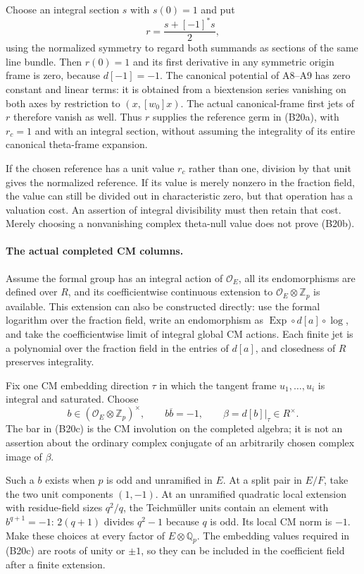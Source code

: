 \documentclass[11pt]{article}
\newcommand{\Q}{\mathbb Q}\newcommand{\C}{\mathbb C}\newcommand{\Z}{\mathbb Z}\newcommand{\R}{\mathbb R}\newcommand{\A}{\mathbb A}\newcommand{\OO}{\mathcal O}
\theoremstyle{definition}\newtheorem{definition}[theorem]{Definition}\newtheorem{remark}[theorem]{Remark}
\begin{document}
Choose an integral section $s$ with $s(0)=1$ and put
\[
                        r=\frac{s+[-1]^*s}{2},
\]
using the normalized symmetry to regard both summands as
sections of the same line bundle.  Then $r(0)=1$ and its
first derivative in any symmetric origin frame is zero,
because $d[-1]=-1$.  The canonical potential of A8--A9 has
zero constant and linear terms: it is obtained from a
biextension series vanishing on both axes by restriction
to $(x,[w_0]x)$.  The actual canonical-frame first jets of
$r$ therefore vanish as well.  Thus $r$ supplies the reference
germ in (B20a), with $r_c=1$ and with an integral section,
without assuming the integrality of its entire canonical
theta-frame expansion.

If the chosen reference has a unit value $r_c$ rather than one,
division by that unit gives the normalized reference.  If its
value is merely nonzero in the fraction field, the value can
still be divided out in characteristic zero, but that operation
has a valuation cost.  An assertion of integral divisibility
must then retain that cost.  Merely choosing a nonvanishing
complex theta-null value does not prove (B20b).

\paragraph{The actual completed CM columns.}
Assume the formal group has an integral action of $\OO_E$,
all its endomorphisms are defined over $R$, and its coefficientwise
continuous extension to $\OO_E\otimes\Z_p$ is available.
This extension can also be constructed directly: use the formal
logarithm over the fraction field, write an endomorphism as
$\operatorname{Exp}\circ d[a]\circ\log$, and take the
coefficientwise limit of integral global CM actions.  Each finite
jet is a polynomial over the fraction field in the entries of
$d[a]$, and closedness of $R$ preserves integrality.

Fix one CM embedding direction $\tau$ in which the tangent
frame $u_1,\ldots,u_i$ is integral and saturated.  Choose
\[
 b\in(\OO_E\otimes\Z_p)^\times,
                   \qquad b\overline b=-1,
                   \qquad \beta=d[b]|_\tau\in R^\times.
 \tag{B20c}
\]
The bar in (B20c) is the CM involution on the completed algebra;
it is not an assertion about the ordinary complex conjugate
of an arbitrarily chosen complex image of $\beta$.

Such a $b$ exists when $p$ is odd and unramified in $E$.
At a split pair in $E/F$, take the two unit components
$(1,-1)$.  At an unramified quadratic local extension with
residue-field sizes $q^2/q$, the Teichm\"uller units contain an
element with $b^{q+1}=-1$: $2(q+1)$ divides $q^2-1$ because
$q$ is odd.  Its local CM norm is $-1$.
Make these choices at every factor of $E\otimes\Q_p$.
The embedding values required in (B20c) are roots of unity or
$\pm1$, so they can be included in the coefficient field after
a finite extension.
\end{document}
